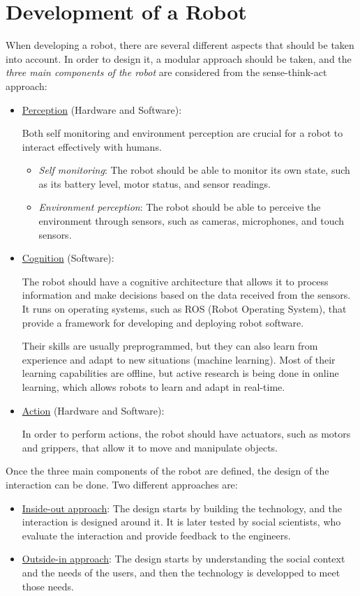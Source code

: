 \section{Development of a Robot}

When developing a robot, there are several different aspects that should be taken into account. In order to design it, a modular approach should be taken, and the \emph{three main components of the robot} are considered from the  sense-think-act approach:
\begin{itemize}
    \item \ul{Perception} (Hardware and Software):
    
    Both self monitoring and environment perception are crucial for a robot to interact effectively with humans.
    \begin{itemize}
        \item \emph{Self monitoring}: The robot should be able to monitor its own state, such as its battery level, motor status, and sensor readings.
        \item \emph{Environment perception}: The robot should be able to perceive the environment through sensors, such as cameras, microphones, and touch sensors.
    \end{itemize}
    \item \ul{Cognition} (Software):
    
    The robot should have a cognitive architecture that allows it to process information and make decisions based on the data received from the sensors. It runs on operating systems, such as ROS (Robot Operating System), that provide a framework for developing and deploying robot software.

    Their skills are usually preprogrammed, but they can also learn from experience and adapt to new situations (machine learning). Most of their learning capabilities are offline, but active research is being done in online learning, which allows robots to learn and adapt in real-time.
    \item \ul{Action} (Hardware and Software):
    
    In order to perform actions, the robot should have actuators, such as motors and grippers, that allow it to move and manipulate objects.
\end{itemize}

Once the three main components of the robot are defined, the design of the interaction can be done. Two different approaches are:
\begin{itemize}
    \item \ul{Inside-out approach}: The design starts by building the technology, and the interaction is designed around it. It is later tested by social scientists, who evaluate the interaction and provide feedback to the engineers.
    \item \ul{Outside-in approach}: The design starts by understanding the social context and the needs of the users, and then the technology is developped to meet those needs. 
\end{itemize}

